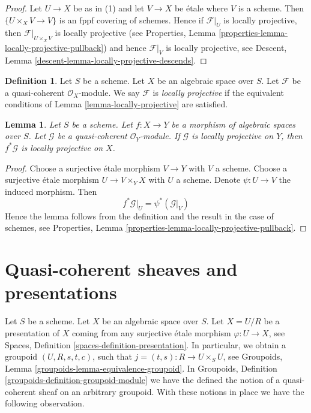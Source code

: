 \documentclass{stacks-project}
\theoremstyle{plain}
\newtheorem{lemma}[subsection]{Lemma}
\theoremstyle{definition}
\newtheorem{definition}[subsection]{Definition}
\theoremstyle{remark}
\numberwithin{equation}{subsection}
\begin{document}
\begin{proof}
Let $U \to X$ be as in (1) and let $V \to X$ be \'etale where
$V$ is a scheme. Then $\{U \times_X V \to V\}$ is an fppf covering
of schemes. Hence if $\mathcal{F}|_U$ is locally projective, then
$\mathcal{F}|_{U \times_X V}$ is locally projective (see
Properties, Lemma \ref{properties-lemma-locally-projective-pullback})
and hence $\mathcal{F}|_V$ is locally projective, see
Descent, Lemma \ref{descent-lemma-locally-projective-descends}.
\end{proof}

\begin{definition}
\label{definition-locally-projective}
Let $S$ be a scheme. Let $X$ be an algebraic space over $S$.
Let $\mathcal{F}$ be a quasi-coherent $\mathcal{O}_X$-module.
We say $\mathcal{F}$ is {\it locally projective}
if the equivalent conditions of
Lemma \ref{lemma-locally-projective}
are satisfied.
\end{definition}

\begin{lemma}
\label{lemma-locally-projective-pullback}
Let $S$ be a scheme.
Let $f : X \to Y$ be a morphism of algebraic spaces over $S$.
Let $\mathcal{G}$ be a quasi-coherent $\mathcal{O}_Y$-module.
If $\mathcal{G}$ is locally projective on $Y$, then $f^*\mathcal{G}$
is locally projective on $X$.
\end{lemma}

\begin{proof}
Choose a surjective \'etale morphism $V \to Y$ with $V$ a scheme.
Choose a surjective \'etale morphism $U \to V \times_Y X$ with
$U$ a scheme. Denote $\psi : U \to V$ the induced morphism.
Then
$$
f^*\mathcal{G}|_U = \psi^*(\mathcal{G}|_V)
$$
Hence the lemma follows from the definition and the result in the
case of schemes, see
Properties, Lemma \ref{properties-lemma-locally-projective-pullback}.
\end{proof}





\section{Quasi-coherent sheaves and presentations}
\label{section-quasi-coherent-presentation}

\noindent
Let $S$ be a scheme. Let $X$ be an algebraic space over $S$.
Let $X = U/R$ be a presentation of $X$ coming from any surjective
\'etale morphism $\varphi : U \to X$, see
Spaces, Definition \ref{spaces-definition-presentation}.
In particular, we obtain a groupoid $(U, R, s, t, c)$, such that
$j = (t, s) : R \to U \times_S U$, see
Groupoids, Lemma \ref{groupoids-lemma-equivalence-groupoid}.
In
Groupoids, Definition \ref{groupoids-definition-groupoid-module}
we have the defined the notion of a quasi-coherent sheaf
on an arbitrary groupoid. With these notions in place we have
the following observation.
\end{document}
